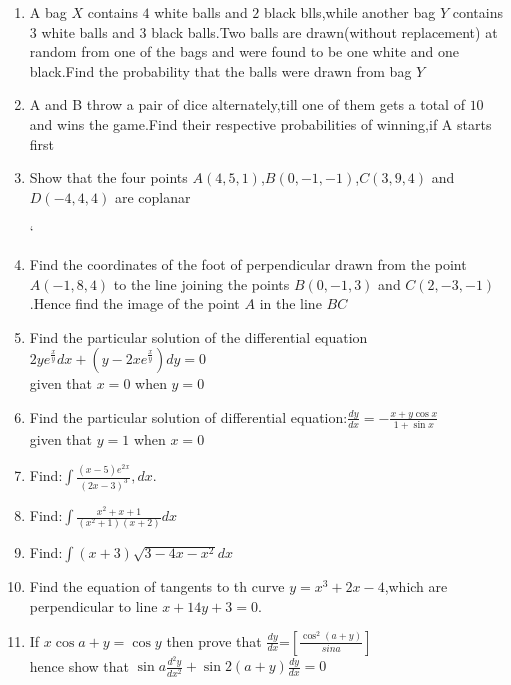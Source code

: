 \documentclass{article}
\begin{document}
\begin{enumerate}
	\item A bag $X$ contains $4$ white balls and $2$ black blls,while another bag $Y$ contains $3$ white balls and $3$ black balls.Two balls are drawn(without replacement) at random from one of the bags and were found to be one white and one black.Find the probability that the balls were drawn from bag $Y$
	
	\item A and B throw a pair of dice alternately,till one of them gets a total of $10$ and wins the game.Find their respective probabilities of winning,if A starts first		


\item Show that the four points $A(4,5,1)$,$B(0,-1,-1)$,$C(3,9,4)$ and $D(-4,4,4)$ are coplanar

`


\item Find the coordinates of the foot of perpendicular drawn from the point $A(-1,8,4)$ to the line joining the points $B(0,-1,3)$ and $C(2,-3,-1)$.Hence find the image of the point $A$ in the line $BC$

\item Find the particular solution of the differential equation $2ye^\frac{x}{y}dx+({y-2xe^\frac{x}{y}})dy=0$\\
	given that $x=0$  when $y=0$




\item Find the particular solution of differential equation:$\frac{dy}{dx}=-\frac{x+y\cos x}{1+\sin x}$\\ given that $y=1$ when $x=0$ 


  \item Find:$\int\frac{(x-5)e^2{}^x}{(2x-3)^3},dx$.


  \item Find:$\int\frac{x^2+x+1}{(x^2+1)(x+2)}dx$






  \item Find:$\int{(x+3)}\sqrt{3-4x-x^2}dx$

  \item Find the equation of tangents to th curve $y=x^3+2x-4$,which are perpendicular to line $x+14y+3=0$.
		  
 \item If $x\cos{a+y}=\cos{y}$ then prove that $\frac{dy}{dx}$=$[\frac{\cos^2(a+y)}{sina}]$\\
	 hence show that $\sin a\frac{d^{2}y}{dx^2}+\sin2(a+y)\frac{dy}{dx}=0$


\end{enumerate}
\end{document}
